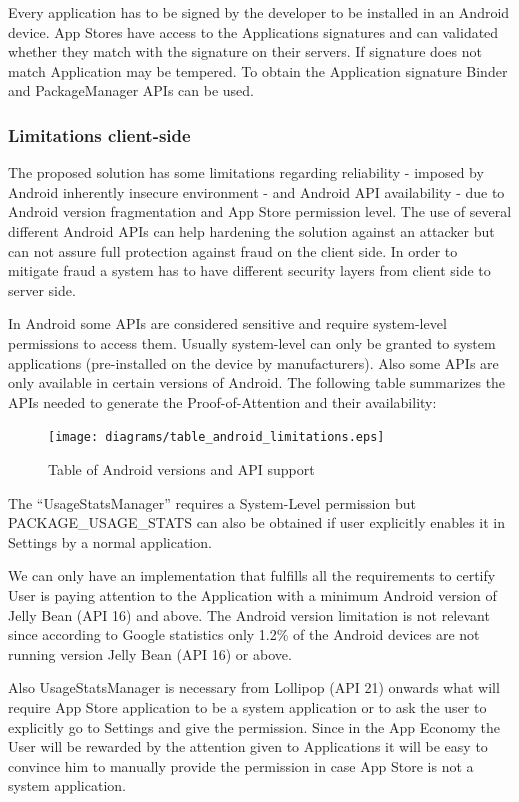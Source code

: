 Every application has to be signed by the developer to be installed in an Android device. App Stores have access to the Applications signatures and can validated whether they match with the signature on their servers. If signature does not match Application may be tempered. To obtain the Application signature Binder and PackageManager APIs can be used.

\subsubsection{Limitations client-side}

The proposed solution has some limitations regarding reliability - imposed by Android inherently insecure environment - and Android API availability - due to Android version fragmentation and App Store permission level. The use of several different Android APIs can help hardening the solution against an attacker but can not assure full protection against fraud on the client side. In order to mitigate fraud a system has to have different security layers from client side to server side. 

In Android some APIs are considered sensitive and require system-level permissions to access them. Usually system-level can only be granted to system applications (pre-installed on the device by manufacturers). Also some APIs are only available in certain versions of Android. The following table summarizes the APIs needed to generate the Proof-of-Attention and their availability:


\begin{figure}[!ht]
\centering
\texttt{[image: diagrams/table\_android\_limitations.eps]}
\caption{Table of Android versions and API support}
\label{fig:android_versions}
\end{figure}

The ``UsageStatsManager'' requires a System-Level permission but PACKAGE\_USAGE\_STATS can also be obtained if user explicitly enables it in Settings by a normal application.

We can only have an implementation that fulfills all the requirements to certify User is paying attention to the Application with a minimum Android version of Jelly Bean (API 16) and above. The Android version limitation is not relevant since according to Google statistics only 1.2\% of the Android devices are not running version Jelly Bean (API 16) or above. 

Also UsageStatsManager is necessary from Lollipop (API 21) onwards what will require App Store application to be a system application or to ask the user to explicitly go to Settings and give the permission. Since in the App Economy the User will be rewarded by the attention given to Applications it will be easy to convince him to manually provide the permission in case App Store is not a system application.


